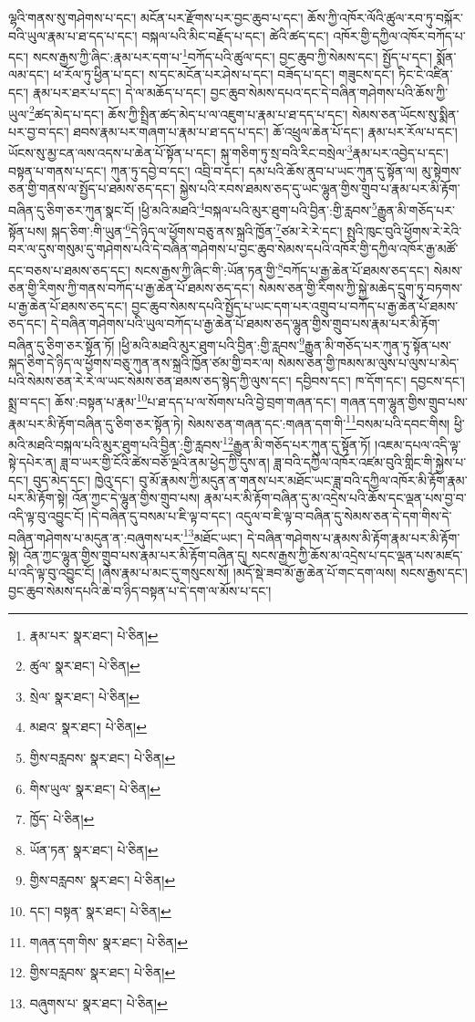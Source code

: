 ལྷའི་གནས་སུ་གཤེགས་པ་དང་། མངོན་པར་རྫོགས་པར་བྱང་ཆུབ་པ་དང་། ཆོས་ཀྱི་འཁོར་ལོའི་ཚུལ་རབ་ཏུ་བསྐོར་བའི་ཡུལ་རྣམ་པ་ཐ་དད་པ་དང་། བསྐལ་པའི་མིང་བརྗོད་པ་དང་། ཚེའི་ཚད་དང་། འཁོར་གྱི་དཀྱིལ་འཁོར་བཀོད་པ་དང་། སངས་རྒྱས་ཀྱི་ཞིང་:རྣམ་པར་དག་པ་\footnote{རྣམ་པར་  སྣར་ཐང་།  པེ་ཅིན། }བཀོད་པའི་ཚུལ་དང་། བྱང་ཆུབ་ཀྱི་སེམས་དང་། སྤྱོད་པ་དང་། སྨོན་ལམ་དང་། ཕ་རོལ་ཏུ་ཕྱིན་པ་དང་། ས་དང་མངོན་པར་ཤེས་པ་དང་། བཟོད་པ་དང་། གཟུངས་དང་། ཏིང་ངེ་འཛིན་དང་། རྣམ་པར་ཐར་པ་དང་། དེ་ལ་མཆོད་པ་དང་། བྱང་ཆུབ་སེམས་དཔའ་དང་དེ་བཞིན་གཤེགས་པའི་ཆོས་ཀྱི་ཡུལ་\footnote{ཚུལ་  སྣར་ཐང་།  པེ་ཅིན། }ཚད་མེད་པ་དང་། ཆོས་ཀྱི་སྤྲིན་ཚད་མེད་པ་ལ་འཇུག་པ་རྣམ་པ་ཐ་དད་པ་དང་། སེམས་ཅན་ཡོངས་སུ་སྨིན་པར་བྱ་བ་དང་། ཐབས་རྣམ་པར་གཞག་པ་རྣམ་པ་ཐ་དད་པ་དང་། ཆོ་འཕྲུལ་ཆེན་པོ་དང་། རྣམ་པར་རོལ་པ་དང་། ཡོངས་སུ་མྱ་ངན་ལས་འདས་པ་ཆེན་པོ་སྟོན་པ་དང་། སྐུ་གཅིག་ཏུ་སྲ་བའི་རིང་བསྲེལ་\footnote{སྲེལ་  སྣར་ཐང་།  པེ་ཅིན། }རྣམ་པར་འབྱེད་པ་དང་། བསྟན་པ་གནས་པ་དང་། ཀུན་ཏུ་དབྱེ་བ་དང་། འབྲི་བ་དང་། དམ་པའི་ཆོས་ནུབ་པ་ཡང་ཀུན་དུ་སྟོན་ལ། མུ་སྟེགས་ཅན་གྱི་གནས་ལ་སྤྱོད་པ་ཐམས་ཅད་དང་། སྐྱེས་པའི་རབས་ཐམས་ཅད་དུ་ཡང་ལྷུན་གྱིས་གྲུབ་པ་རྣམ་པར་མི་རྟོག་བཞིན་དུ་ཅིག་ཅར་ཀུན་སྣང་ངོ། །ཕྱི་མའི་མཐའི་\footnote{མཐའ་  སྣར་ཐང་།  པེ་ཅིན། }བསྐལ་པའི་མུར་ཐུག་པའི་བྱིན་:གྱི་རླབས་\footnote{གྱིས་བརླབས་  སྣར་ཐང་།  པེ་ཅིན། }རྒྱུན་མི་གཅོད་པར་སྟོན་པས། སྐད་ཅིག་:གི་ཡུན་\footnote{གིས་ཡུལ་  སྣར་ཐང་།  པེ་ཅིན། }དེ་ཉིད་ལ་ཕྱོགས་བཅུ་ནས་སྐྲའི་ཁྱོན་\footnote{ཁྱོད་  པེ་ཅིན། }ཙམ་རེ་རེ་དང་། སྤུའི་ཁུང་བུའི་ཕྱོགས་རེ་རེའི་བར་ལ་དུས་གསུམ་དུ་གཤེགས་པའི་དེ་བཞིན་གཤེགས་པ་བྱང་ཆུབ་སེམས་དཔའི་འཁོར་གྱི་དཀྱིལ་འཁོར་རྒྱ་མཚོ་དང་བཅས་པ་ཐམས་ཅད་དང་། སངས་རྒྱས་ཀྱི་ཞིང་གི་:ཡོན་ཏན་གྱི་\footnote{ཡོན་ཏན་  སྣར་ཐང་།  པེ་ཅིན། }བཀོད་པ་རྒྱ་ཆེན་པོ་ཐམས་ཅད་དང་། སེམས་ཅན་གྱི་རིགས་ཀྱི་གནས་བཀོད་པ་རྒྱ་ཆེན་པོ་ཐམས་ཅད་དང་། སེམས་ཅན་གྱི་རིགས་ཀྱི་སྐྱེ་མཆེད་དྲུག་ཏུ་བཏགས་པ་རྒྱ་ཆེན་པོ་ཐམས་ཅད་དང་། བྱང་ཆུབ་སེམས་དཔའི་སྤྱོད་པ་ཡང་དག་པར་འགྲུབ་པ་བཀོད་པ་རྒྱ་ཆེན་པོ་ཐམས་ཅད་དང་། དེ་བཞིན་གཤེགས་པའི་ཡུལ་བཀོད་པ་རྒྱ་ཆེན་པོ་ཐམས་ཅད་ལྷུན་གྱིས་གྲུབ་པས་རྣམ་པར་མི་རྟོག་བཞིན་དུ་ཅིག་ཅར་སྟོན་ཏོ། །ཕྱི་མའི་མཐའི་མུར་ཐུག་པའི་བྱིན་:གྱི་རླབས་\footnote{གྱིས་བརླབས་  སྣར་ཐང་།  པེ་ཅིན། }རྒྱུན་མི་གཅོད་པར་ཀུན་ཏུ་སྟོན་པས་སྐད་ཅིག་དེ་ཉིད་ལ་ཕྱོགས་བཅུ་ཀུན་ནས་སྐྲའི་ཁྱོན་ཙམ་གྱི་བར་ལ། སེམས་ཅན་གྱི་ཁམས་མ་ལུས་པ་ལུས་པ་མེད་པའི་སེམས་ཅན་རེ་རེ་ལ་ཡང་སེམས་ཅན་ཐམས་ཅད་སྙེད་ཀྱི་ལུས་དང་། དབྱིབས་དང་། ཁ་དོག་དང་། དབྱངས་དང་། སྨྲ་བ་དང་། ཆོས་:བསྟན་པ་རྣམ་\footnote{དང་། བསྟན་  སྣར་ཐང་།  པེ་ཅིན། }པ་ཐ་དད་པ་ལ་སོགས་པའི་བྱེ་བྲག་གཞན་དང་། གཞན་དག་ལྷུན་གྱིས་གྲུབ་པས་རྣམ་པར་མི་རྟོག་བཞིན་དུ་ཅིག་ཅར་སྟོན་ཏེ། སེམས་ཅན་གཞན་དང་:གཞན་དག་གི་\footnote{གཞན་དག་གིས་  སྣར་ཐང་།  པེ་ཅིན། }བསམ་པའི་དབང་གིས། ཕྱི་མའི་མཐའི་བསྐལ་པའི་མུར་ཐུག་པའི་བྱིན་:གྱི་རླབས་\footnote{གྱིས་བརླབས་  སྣར་ཐང་།  པེ་ཅིན། }རྒྱུན་མི་གཅོད་པར་ཀུན་དུ་སྟོན་ཏོ། །འཇམ་དཔལ་འདི་ལྟ་སྟེ་དཔེར་ན། ཟླ་བ་ཡར་གྱི་ངོའི་ཚེས་བཅོ་ལྔའི་ནམ་ཕྱེད་ཀྱི་དུས་ན། ཟླ་བའི་དཀྱིལ་འཁོར་འཛམ་བུའི་གླིང་གི་སྐྱེས་པ་དང་། བུད་མེད་དང་། ཁྱེའུ་དང་། བུ་མོ་རྣམས་ཀྱི་མདུན་ན་གནས་པར་མཐོང་ཡང་ཟླ་བའི་དཀྱིལ་འཁོར་མི་རྟོག་རྣམ་པར་མི་རྟོག་སྟེ། འོན་ཀྱང་དེ་ལྷུན་གྱིས་གྲུབ་པས། རྣམ་པར་མི་རྟོག་བཞིན་དུ་མ་འདྲེས་པའི་ཆོས་དང་ལྡན་པས་བྱ་བ་འདི་ལྟ་བུ་འབྱུང་ངོ། །དེ་བཞིན་དུ་བསམ་པ་ཇི་ལྟ་བ་དང་། འདུལ་བ་ཇི་ལྟ་བ་བཞིན་དུ་སེམས་ཅན་དེ་དག་གིས་དེ་བཞིན་གཤེགས་པ་མདུན་ན་:བཞུགས་པར་\footnote{བཞུགས་པ་  སྣར་ཐང་།  པེ་ཅིན། }མཐོང་ཡང་། དེ་བཞིན་གཤེགས་པ་རྣམས་མི་རྟོག་རྣམ་པར་མི་རྟོག་སྟེ། འོན་ཀྱང་ལྷུན་གྱིས་གྲུབ་པས་རྣམ་པར་མི་རྟོག་བཞིན་དུ། སངས་རྒྱས་ཀྱི་ཆོས་མ་འདྲེས་པ་དང་ལྡན་པས་མཛད་པ་འདི་ལྟ་བུ་འབྱུང་ངོ། །ཞེས་རྣམ་པ་མང་དུ་གསུངས་སོ། །མདོ་སྡེ་ཟབ་མོ་རྒྱ་ཆེན་པོ་གང་དག་ལས། སངས་རྒྱས་དང་། བྱང་ཆུབ་སེམས་དཔའི་ཆེ་བ་ཉིད་བསྟན་པ་དེ་དག་ལ་མོས་པ་དང་། 